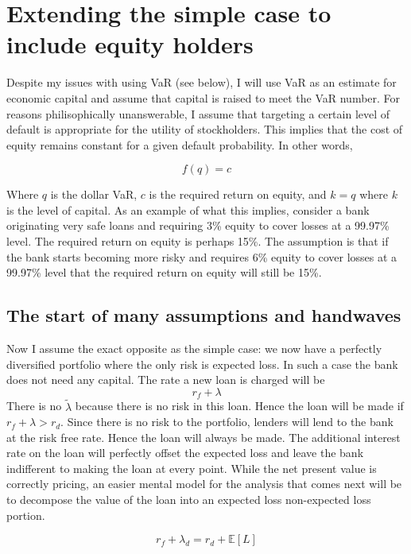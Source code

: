 \documentclass{article}
\begin{document}
\section{Extending the simple case to include equity holders}
Despite my issues with using VaR (see below), I will use VaR as an estimate for economic capital and assume that capital is raised to meet the VaR number.  For reasons philisophically unanswerable, I assume that targeting a certain level of default is appropriate for the utility of stockholders.  This implies that the cost of equity remains constant for a given default probability.  In other words, 

\[f(q)=c\]

Where \(q\) is the dollar VaR, \(c\) is the required return on equity, and \(k=q\) where \(k\) is the level of capital.  As an example of what this implies, consider a bank originating very safe loans and requiring 3\% equity to cover losses at a 99.97\% level.  The required return on equity is perhaps 15\%.  The assumption is that if the bank starts becoming more risky and requires 6\% equity to cover losses at a 99.97\% level that the required return on equity will still be 15\%.  

\subsection{The start of many assumptions and handwaves}

Now I assume the exact opposite as the simple case: we now have a perfectly diversified portfolio where the only risk is expected loss.  In such a case the bank does not need any capital.  The rate a new loan is charged will be 
\[r_f+\lambda\]
There is no \(\tilde{\lambda}\) because there is no risk in this loan.  Hence the loan will be made if \(r_f+\lambda>r_d\).  Since there is no risk to the portfolio, lenders will lend to the bank at the risk free rate.  Hence the loan will always be made.  The additional interest rate on the loan will perfectly offset the expected loss and leave the bank indifferent to making the loan at every point.  While the net present value is correctly pricing, an easier mental model for the analysis that comes next will be to decompose the value of the loan into an expected loss non-expected loss portion.  

\[r_f+\lambda_d=r_d+\mathbb{E}[L]\]
\end{document}
